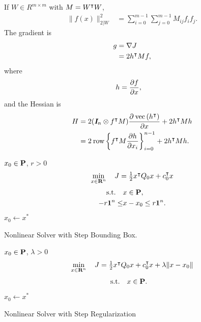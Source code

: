 \documentclass{article}
\begin{document}
    If $W\in R^{m \times m}$ with $M=W^\intercal W$, 
    \begin{align*}
        \|f(x)\|_{2|W}^2 &= \textstyle\sum_{i=0}^{m-1}\sum_{j=0}^{m-1} M_{ij}f_i f_j.
    \end{align*}
    The gradient is
    \begin{align*}
        g & = \nabla J\\
            & = 2h^\intercal M f,
    \end{align*}
    where
    \begin{align*}
        h &= \frac{\partial f}{\partial x},
    \end{align*}
    and the Hessian is
    \begin{align*}
        H&= 
        2(\emph{\textbf{I}}_n \otimes f^\intercal M)\frac{\partial \:\mathrm{vec}\left(h^\intercal\right)}{\partial x}+2h^\intercal M h\\
        &=2\:\text{row}\left\{
            f^\intercal M \frac{\partial h}{\partial x_i}
        \right\}_{i=0}^{n-1}+2h^\intercal M h.
    \end{align*}
    \begin{algorithm}[H]
        \SetAlgoLined
        $x_0 \in\textbf{P}$, $r>0$\\
        {
            \begin{align*}
                \min_{x\in\textbf{R}^n}\quad J = \textstyle\frac{1}{2}x^\intercal Q_0 x+c_0^\intercal x 
            \end{align*}
            \begin{align*}
                \text{s.t.} \quad &x\in\textbf{P},\\
                -r\textbf{1}^n\leq&x-x_0\leq r\textbf{1}^n.
            \end{align*}
            $x_0\leftarrow x^*$
        }
    \caption{Nonlinear Solver with Step Bounding Box.}
    \label{algo:it21}
    \end{algorithm}
    \begin{algorithm}[H]
        \SetAlgoLined
        $x_0 \in\textbf{P}$, $\lambda>0$\\
        {
            \begin{align*}
                \min_{x\in\textbf{R}^n}\quad J = \textstyle\frac{1}{2}x^\intercal Q_0 x+c_0^\intercal x +\lambda \|x-x_0\|
            \end{align*}
            \begin{align*}
                \text{s.t.} \quad &x\in\textbf{P}.
            \end{align*}
            $x_0\leftarrow x^*$
        }
    \caption{Nonlinear Solver with Step Regularization}
    \label{algo:it22}
    \end{algorithm}
\end{document}

